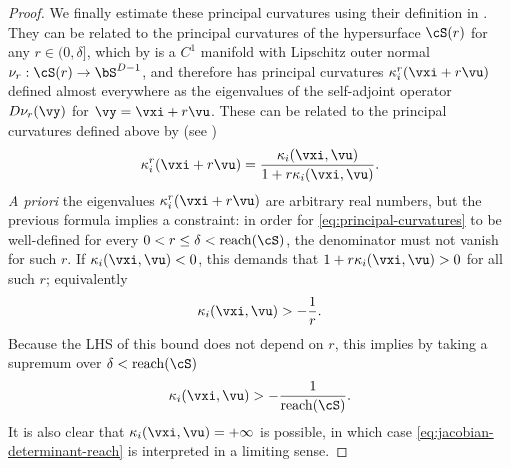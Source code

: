 \documentclass[../../book-main.tex]{subfiles}
\begin{document}
\begin{proof}
    We finally estimate these principal curvatures using their definition in
    \cite{Zahle1986-cp}. They can be related to the principal curvatures of the
    hypersurface $\cS(r)$ for any $r \in (0, \delta]$, which by
    \cite{Federer1959-gk} is a $C^1$ manifold with Lipschitz outer normal
    $\nu_r : \cS(r) \to \bS^{D-1}$, and therefore has principal curvatures
    $\kappa_i^r(\vxi + r \vu )$
    defined almost everywhere as the eigenvalues of the self-adjoint operator $D
    \nu_r(\vy)$ for $\vy = \vxi + r \vu$.
    These can be related to the principal curvatures defined above by (see
    \cite{Zahle1986-cp})
    \begin{equation}\label{eq:principal-curvatures}
        \kappa_i^r(\vxi + r \vu ) = \frac{\kappa_i(\vxi, \vu)}{1
        + r \kappa_i(\vxi, \vu)}.
    \end{equation}
    \textit{A priori} the eigenvalues $\kappa_i^r(\vxi + r \vu )$ are arbitrary
    real numbers, but the previous formula implies a constraint: in order for  
    \eqref{eq:principal-curvatures} to be well-defined for every $0
    < r \leq \delta < \mathrm{reach}(\cS)$, the denominator must not vanish for
    such $r$. If $\kappa_i(\vxi, \vu) < 0$, this demands that $1
    + r \kappa_i(\vxi, \vu) > 0$ for all such $r$; equivalently
    \begin{equation}
        \kappa_i(\vxi, \vu) > -\frac{1}{r}.
    \end{equation}
    Because the LHS of this bound does not depend on $r$, this implies
    by taking a supremum over $\delta < \mathrm{reach}(\cS)$
    \begin{equation}\label{eq:principal-curvatures-not-too-neg}
        \kappa_i(\vxi, \vu) > -\frac{1}{\mathrm{reach}(\cS)}.
    \end{equation}
    It is also clear that $\kappa_i(\vxi, \vu) = +\infty$ is possible, in which
    case \eqref{eq:jacobian-determinant-reach} is interpreted in a limiting
    sense.
    

\end{proof}
\end{document}
